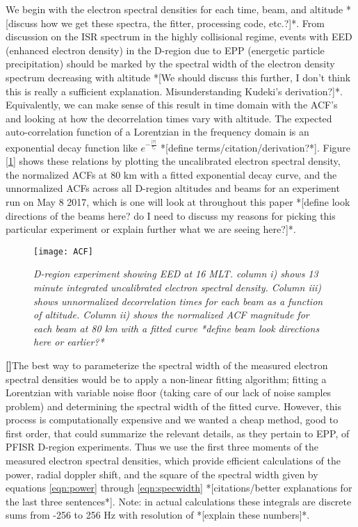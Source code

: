 \documentclass{article}
\newcounter{para}
\newcommand\mypara{\par\refstepcounter{para}\textbf{[\thepara]}\space}
\begin{document}
We begin with the electron spectral densities for each time, beam, and altitude *[discuss how we get these spectra, the fitter, processing code, etc.?]*. From discussion on the ISR spectrum in the highly collisional regime, events with EED (enhanced electron density) in the D-region due to EPP (energetic particle precipitation) should be marked by the spectral width of the electron density spectrum decreasing with altitude *[We should discuss this further, I don't think this is really a sufficient explanation. Misunderstanding Kudeki's derivation?]*. Equivalently, we can make sense of this result in time domain with the ACF's and looking at how the decorrelation times vary with altitude. The expected auto-correlation function of a Lorentzian in the frequency domain is an exponential decay function like $e^{-\frac{\left|\tau\right|}{\tau_c}}$ *[define terms/citation/derivation?*]. Figure [\ref{fig:acf}] shows these relations by plotting the uncalibrated electron spectral density, the normalized ACFs at 80 km with a fitted exponential decay curve, and the unnormalized ACFs across all D-region altitudes and beams for an experiment run on May 8 2017, which is one will look at throughout this paper *[define look directions of the beams here? do I need to discuss my reasons for picking this particular experiment or explain further what we are seeing here?]*.
\begin{figure}[t] %
	\centering
	\texttt{[image: ACF]}
	\caption[Short caption]{\textit{D-region experiment showing EED at 16 MLT. column i) shows 13 minute integrated uncalibrated electron spectral density. Column iii) shows unnormalized decorrelation times for each beam as a function of altitude. Column ii) shows the normalized ACF magnitude for each beam at 80 km with a fitted curve *define beam look directions here or earlier?*}}
	\label{fig:acf}
\end{figure}
\mypara The best way to parameterize the spectral width of the measured electron spectral densities would be to apply a non-linear fitting algorithm; fitting a Lorentzian with variable noise floor (taking care of our lack of noise samples problem) and determining the spectral width of the fitted curve. However, this process is computationally expensive and we wanted a cheap method, good to first order, that could summarize the relevant details, as they pertain to EPP, of PFISR D-region experiments. Thus we use the first three moments of the measured electron spectral densities, which provide efficient calculations of the power, radial doppler shift, and the square of the spectral width given by equations \ref{eqn:power} through \ref{eqn:specwidth} *[citations/better explanations for the last three sentences*]. Note: in actual calculations these integrals are discrete sums from -256 to 256 Hz with resolution of *[explain these numbers]*. 
\end{document}
